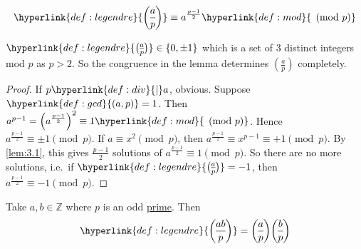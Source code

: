 \documentclass{article}
\newcommand{\legendre}[2]{\genfrac{(}{)}{}{}{#1}{#2}}
\begin{document}

\begin{lemma}
    \begin{equation*}
        \hyperlink{def:legendre}{\legendre{a}{p}} \equiv a^{\frac{p-1}{2}} \hyperlink{def:mod}{\pmod{p}}
    \end{equation*}
\end{lemma}

\begin{remark}
    $\hyperlink{def:legendre}{\legendre{a}{p}} \in \{0, \pm 1\}$ which is a set of $3$ distinct integers mod $p$ as $p > 2$. So the congruence in the lemma determines $\legendre{a}{p}$ completely.
\end{remark}

\begin{proof}
    If $p \hyperlink{def:div}{\mid} a$, obvious.
    Suppose $\hyperlink{def:gcd}{(a, p)} = 1$.
    Then $a^{p-1} = \left(a^{\frac{p-1}{2}}\right)^2 \equiv 1 \hyperlink{def:mod}{\pmod{p}}$.
    Hence $a^{\frac{p-1}{2}} \equiv \pm 1 \pmod{p}$.
    If $a \equiv x^2 \pmod{p}$, then $a^{\frac{p-1}{2}} \equiv x^{p-1} \equiv +1 \pmod{p}$.
    By \cref{lem:3.1}, this gives $\frac{p-1}{2}$ solutions of $a^{\frac{p-1}{2}} \equiv 1 \pmod{p}$.
    So there are no more solutions, i.e.\ if $\hyperlink{def:legendre}{\legendre{a}{p}} = -1$, then $a^{\frac{p-1}{2}} \equiv -1 \pmod{p}$.
\end{proof}

\begin{ncor}\label{cor:3.2}
    Take $a, b \in \mathbb{Z}$ where $p$ is an odd \hyperlink{def:prime}{prime}. Then
    \begin{equation*}
        \hyperlink{def:legendre}{\legendre{ab}{p}} = \legendre{a}{p} \legendre{b}{p}
    \end{equation*}
\end{ncor}
\end{document}
